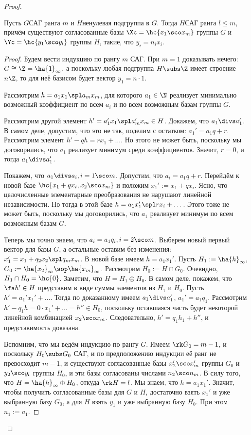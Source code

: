 \documentclass[a4paper]{article}
\begin{document}
\begin{proof}
\begin{theorem}
Пусть $G$\т САГ ранга $m$ и $H$\т ненулевая подгруппа в $G$. Тогда $H$\т САГ  ранга $l \le m$, причём
существуют согласованные базы $\Xc = \hc{x_1\sco x_m}$ группы $G$ и $\Yc=\hc{y_1\sco y_l}$ группы $H$, такие,
что $y_i=n_ix_i$.
\end{theorem}
\begin{proof}
Будем вести индукцию по рангу $m$ САГ. При $m=1$ доказывать нечего:  $G \cong \Z = \ha{1}_\infty$, а
поскольку любая подгруппа $H \subs \Z$ имеет строение $n\Z$, то для неё базисом будет вектор $y_1=n\cdot 1$.

 Рассмотрим $h=a_1x_1 \spl a_mx_m$, для которого $a_1 \in \N$ реализует  минимально возможный
коэффициент по всем $a_i$ и по всем возможным базам группы $G$.

 Рассмотрим другой элемент $h'=a_1'x_1 \spl a_m'x_m \in H$. Докажем,  что $a_1 \divs a_1'$. В самом
деле, допустим, что это не так, поделим с остатком: $a_1'=a_1q+r$. Рассмотрим элемент $h'-qh=rx_1+\dots$. Но
этого не может быть, поскольку мы договорились, что $a_1$ реализует минимум среди коэффициентов. Значит,
$r=0$, и тогда $a_1 \divs a_1'$.

 Покажем, что $a_1 \divs a_i, i=1\sco m$. Допустим, что $a_i=a_1q+r$.  Перейдём к новой базе
$\hc{x_1+qx_i,x_2\sco x_m}$ и положим $x_1' := x_1+qx_i$. Ясно, что целочисленные элементарные преобразования
не нарушают линейной независимости. Но тогда в этой базе $h=a_1x_1' \spl rx_i+\dots$. Этого тоже не может
быть, поскольку мы договорились, что $a_1$ реализует минимум по всем возможным базам $G$.

 Теперь мы точно знаем, что $a_i=a_1q_i, i=2\sco m$. Выберем новый первый  вектор для базы $G$, а
остальные оставим без изменения: $x_1'=x_1+q_2x_2 \spl q_mx_m$. В новой базе имеем $h=a_1x_1'$. Пусть
$H_1:=\ha{h}_\infty$, $G_0:=\ha{x_2}_\infty\sop \ha{x_m}_\infty$. Рассмотрим $H_0:=H \cap G_0$. Очевидно,
$H_1 \cap H_0 = \hc{0}$. Заметим, что $H=H_1 \oplus H_0$. В самом деле, покажем, что $\fa h' \in H$
представим в виде суммы элементов из $H_1$ и $H_0$. Пусть $h'=a_1'x_1'+\dots$. Тогда по доказанному имеем
$a_1\divs a_1'$,  $a_1'=a_1q_1$. Рассмотрим $h'-q_1h=0\cdot x_1'+\dots=h'' \in H_0$, поскольку оставшаяся
часть будет некоторой линейной комбинацией $x_2\sco x_m$. Следовательно, $h'=q_1h_1+h''$, и представимость
доказана.

 Вспомним, что мы ведём индукцию по рангу $G$. Имеем $\rk G_0 = m-1$, и  поскольку $H_0 \subs G_0$\т
САГ, и по предположению индукции её ранг не превосходит $m-1$, и существуют согласованные базы $x_2'\sco
x_m'$ группы $G_0$ и $y_2\sco y_l$ группы $H_0$, и эти базы согласованы числами $n_2\sco n_m$. В силу того,
что $H=\ha{h}_\infty\oplus H_0$, откуда $\rk H = l$. Мы знаем, что $h=a_1x_1'$. Значит, чтобы получить
согласованные базы для $G$ и $H$, достаточно взять $x_1'$ и уже выбранную базу $G_0$, а для $H$ взять $y_1$ и
уже выбранную базу $H_0$. При этом $n_1 := a_1$.
\end{proof}


\end{proof}
\end{document}
